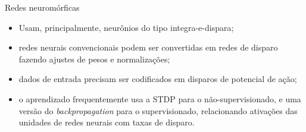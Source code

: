 \begin{frame}{Redes neuromórficas}
	\begin{itemize}
		\item Usam, principalmente, neurônios do tipo integra-e-dispara;
		\item redes neurais convencionais podem ser convertidas em redes de disparo fazendo ajustes de pesos e normalizações;
		\item dados de entrada precisam ser codificados em disparos de potencial de ação;
		\item o aprendizado frequentemente usa a STDP para o não-supervisionado, e uma versão do \textit{backpropagation} para o supervisionado, relacionando ativações das unidades de redes neurais com taxas de disparo.
	\end{itemize}
\end{frame}
